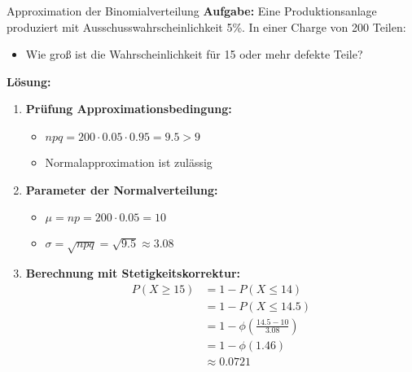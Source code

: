 \begin{example2}{Approximation der Binomialverteilung}
\textbf{Aufgabe:} Eine Produktionsanlage produziert mit Ausschusswahrscheinlichkeit 5\%. In einer Charge von 200 Teilen:
\begin{itemize}
\item Wie groß ist die Wahrscheinlichkeit für 15 oder mehr defekte Teile?
\end{itemize}

\textbf{Lösung:}
\begin{enumerate}
\item \textbf{Prüfung Approximationsbedingung:}
   \begin{itemize}
   \item $npq = 200 \cdot 0.05 \cdot 0.95 = 9.5 > 9$
   \item Normalapproximation ist zulässig
   \end{itemize}

\item \textbf{Parameter der Normalverteilung:}
   \begin{itemize}
   \item $\mu = np = 200 \cdot 0.05 = 10$
   \item $\sigma = \sqrt{npq} = \sqrt{9.5} \approx 3.08$
   \end{itemize}

\item \textbf{Berechnung mit Stetigkeitskorrektur:}
   \begin{align*}
   P(X \geq 15) &= 1 - P(X \leq 14) \\
   &= 1 - P(X \leq 14.5) \\
   &= 1 - \phi(\frac{14.5-10}{3.08}) \\
   &= 1 - \phi(1.46) \\
   &\approx 0.0721
   \end{align*}
\end{enumerate}
\end{example2}

